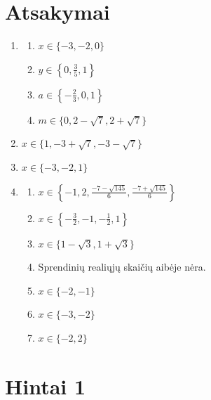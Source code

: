 \documentclass[11pt,a4paper]{scrartcl}
\begin{document}
\newpage
\section{Atsakymai}

\begin{enumerate}[label=\textbf{\arabic*.}, leftmargin=*]
    \item
    \begin{enumerate}[label={(\arabic*)}]
        \item $x\in\{-3,-2,0\}$
        \item $y\in\left\{0,\frac35,1\right\}$
        \item $a\in\left\{-\frac23,0,1\right\}$
        \item $m\in\{0,2-\sqrt7,2+\sqrt7\}$
    \end{enumerate}
    \item
    $x\in\{1,-3+\sqrt7,-3-\sqrt7\}$
    \item
    $x\in\{-3,-2,1\}$
    \item
    \begin{enumerate}[label={(\arabic*)}]
        \item $x\in\left\{-1,2,\frac{-7-\sqrt{145}}6,\frac{-7+\sqrt{145}}6\right\}$
        \item $x\in\left\{-\frac32,-1,-\frac12,1\right\}$
        \item $x\in\{1-\sqrt3,1+\sqrt3\}$
        \item Sprendinių realiųjų skaičių aibėje nėra.
        \item $x\in\{-2,-1\}$
        \item $x\in\{-3,-2\}$
        \item $x\in\{-2,2\}$
    \end{enumerate}
\end{enumerate}

\newpage
\section{Hintai 1}
\end{document}

